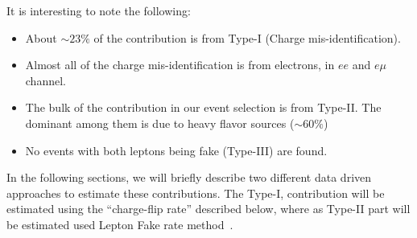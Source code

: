 It is interesting to note the following:
\begin{itemize}
\item About $\sim 23 \%$ of the contribution is from Type-I (Charge mis-identification).
\item Almost all of the charge mis-identification is from electrons, in $ee$ and $e\mu$ channel.
\item The bulk of the \ttbar contribution in our event selection is from Type-II. The dominant among them 
is due to heavy flavor sources ($\sim 60 \%$)
\item No events with both leptons being fake (Type-III) are found.
\end{itemize} 

In the following sections, we will briefly describe two different data driven approaches to 
estimate these contributions. The Type-I, contribution will be estimated using the ``charge-flip rate'' described below, 
where as Type-II part will be estimated used Lepton Fake rate method~\cite{fakelep}.



